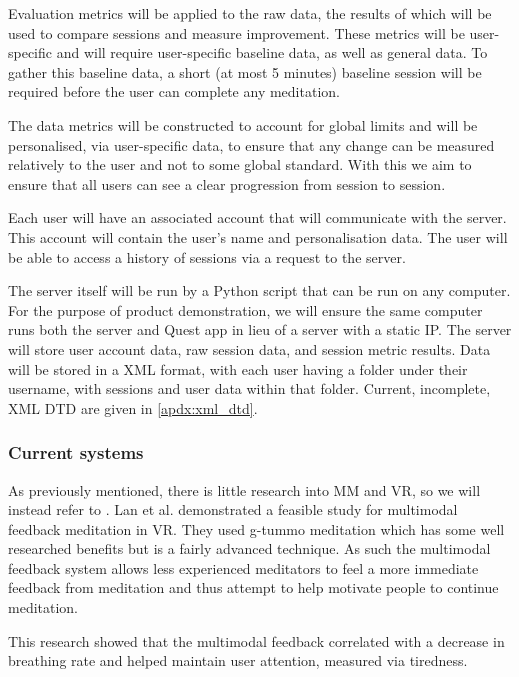 \documentclass[coverpage,lineno]{../custom}
\begin{document}
Evaluation metrics will be applied to the raw data, the results of which will be used to compare sessions and measure improvement. These metrics will be user-specific and will require user-specific baseline data, as well as general data. To gather this baseline data, a short (at most 5 minutes) baseline session will be required before the user can complete any meditation.

The data metrics will be constructed to account for global limits and will be personalised, via user-specific data, to ensure that any change can be measured relatively to the user and not to some global standard. With this we aim to ensure that all users can see a clear progression from session to session.

Each user will have an associated account that will communicate with the server. This account will contain the user's name and personalisation data. The user will be able to access a history of sessions via a request to the server.

The server itself will be run by a Python script that can be run on any computer. For the purpose of product demonstration, we will ensure the same computer runs both the server and Quest app in lieu of a server with a static IP. The server will store user account data, raw session data, and session metric results. Data will be stored in a XML format, with each user having a folder under their username, with sessions and user data within that folder. Current, incomplete, XML DTD are given in \cref{apdx:xml_dtd}.

\subsubsection{Current systems}

As previously mentioned, there is little research into MM and VR, so we will instead refer to \cite{lan_slow_2021}. Lan et al. demonstrated a feasible study for multimodal feedback meditation in VR. They used g-tummo meditation which has some well researched benefits \cite{kozhevnikov_neurocognitive_2013} but is a fairly advanced technique. As such the multimodal feedback system allows less experienced meditators to feel a more immediate feedback from meditation and thus attempt to help motivate people to continue meditation.

This research showed that the multimodal feedback correlated with a decrease in breathing rate and helped maintain user attention, measured via tiredness.
\end{document}
